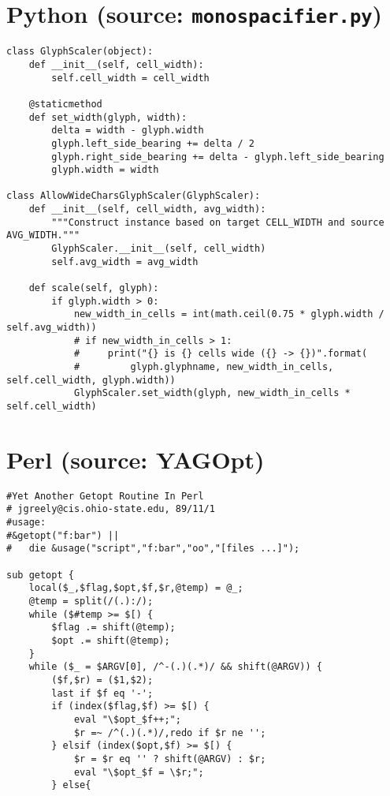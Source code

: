 \documentclass{article}
\begin{document}
\section*{Python (source: \texttt{monospacifier.py})}

\begin{verbatim}
class GlyphScaler(object):
    def __init__(self, cell_width):
        self.cell_width = cell_width

    @staticmethod
    def set_width(glyph, width):
        delta = width - glyph.width
        glyph.left_side_bearing += delta / 2
        glyph.right_side_bearing += delta - glyph.left_side_bearing
        glyph.width = width

class AllowWideCharsGlyphScaler(GlyphScaler):
    def __init__(self, cell_width, avg_width):
        """Construct instance based on target CELL_WIDTH and source AVG_WIDTH."""
        GlyphScaler.__init__(self, cell_width)
        self.avg_width = avg_width

    def scale(self, glyph):
        if glyph.width > 0:
            new_width_in_cells = int(math.ceil(0.75 * glyph.width / self.avg_width))
            # if new_width_in_cells > 1:
            #     print("{} is {} cells wide ({} -> {})".format(
            #         glyph.glyphname, new_width_in_cells, self.cell_width, glyph.width))
            GlyphScaler.set_width(glyph, new_width_in_cells * self.cell_width)
\end{verbatim}

\section*{Perl (source: YAGOpt)}

\begin{verbatim}
#Yet Another Getopt Routine In Perl
# jgreely@cis.ohio-state.edu, 89/11/1
#usage:
#&getopt("f:bar") ||
#	die &usage("script","f:bar","oo","[files ...]");

sub getopt {
    local($_,$flag,$opt,$f,$r,@temp) = @_;
    @temp = split(/(.):/);
    while ($#temp >= $[) {
        $flag .= shift(@temp);
        $opt .= shift(@temp);
    }
    while ($_ = $ARGV[0], /^-(.)(.*)/ && shift(@ARGV)) {
        ($f,$r) = ($1,$2);
        last if $f eq '-';
        if (index($flag,$f) >= $[) {
            eval "\$opt_$f++;";
            $r =~ /^(.)(.*)/,redo if $r ne '';
        } elsif (index($opt,$f) >= $[) {
            $r = $r eq '' ? shift(@ARGV) : $r;
            eval "\$opt_$f = \$r;";
        } else{
\end{verbatim}
\end{document}
